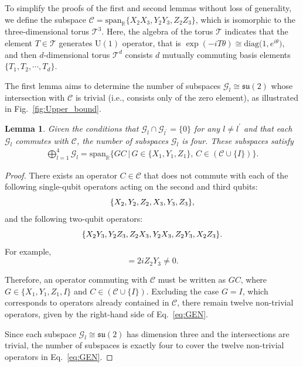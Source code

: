 \documentclass[aps,showpacs,amsmath,amssymb,twocolumn,prx,longbibliography,superscriptaddress,notitlepage,floatfix,10pt]{revtex4-2}
\newtheorem{lemma}{Lemma} %
\begin{document}
To simplify the proofs of the first and second lemmas without loss of generality, we define the subspace $\mathcal{C} = \mathrm{span}_{\mathbb{R}}\{X_{2}X_{3}, Y_{2}Y_{3}, Z_{2}Z_{3}\}$, which is isomorphic to the three-dimensional torus $\mathcal{T}^{3}$. Here, the algebra of the torus $\mathcal{T}$ indicates that the element $T\in\mathcal{T}$ generates $\mathrm{U}(1)$ operator, that is $\exp(-iT\theta)\cong\mathrm{diag}\bigl(1,e^{i\theta}\bigr)$, and then $d$-dimensional torus $\mathcal{T}^d$ consists $d$ mutually commuting basis elements $\{T_{1},T_{2},\cdots,T_d\}$.

The first lemma aims to determine the number of subspaces $\mathcal{G}_{l} \cong \mathfrak{su}(2)$ whose intersection with $\mathcal{C}$ is trivial (i.e., consists only of the zero element), as illustrated in Fig.~\ref{fig:Upper_bound}.

\begin{lemma}
  Given the conditions that
  $\mathcal{G}_{l}\cap \mathcal{G}_{l^{\prime}}=\{0\}$
  for any $l\neq l^{\prime}$ and that each
  $\mathcal{G}_{l}$ commutes with $\mathcal{C}$,
  the number of subspaces $\mathcal{G}_{l}$ is four.
  These subspaces satisfy
  \begin{equation}
      \begin{split}
      \bigoplus_{l=1}^{4}
    \mathcal{G}_{l}
    =
    \mathrm{span}_{\mathbb{R}}
    \bigl\{
        GC
        \,\big|\,
        G\in\{X_{1},Y_{1},Z_{1}\},
        \,
        C\in\left(\mathcal{C}\cup\{I\}\right)
    \bigr\}.
      \end{split}
            \label{eq:GEN}
  \end{equation}
\label{lemma:1}
\end{lemma}

\begin{proof}
There exists an operator $C\in\mathcal{C}$ that does not commute with each of the following single-qubit operators acting on the second and third qubits:
\begin{equation}
    \{ X_{2}, Y_{2}, Z_{2}, X_{3}, Y_{3}, Z_{3} \},
\label{eq:one_ope_{2}3}
\end{equation}
and the following two-qubit operators:
\begin{equation}
    \{ X_{2} Y_{3}, Y_{2} Z_{3}, Z_{2} X_{3},
    Y_{2} X_{3}, Z_{2} Y_{3}, X_{2} Z_{3} \}.
\label{eq:two_ope_{2}3}
\end{equation}
For example,
\begin{equation}
    [ X_{2}, Y_{2} Y_{3} ]
    =
    2 i Z_{2} Y_{3}
    \neq 0.
\end{equation}

Therefore, an operator commuting with $\mathcal{C}$ must be written as $GC$, where
$G\in\{X_{1},Y_{1},Z_{1},I\}$ and
$C\in(\mathcal{C}\cup \{I\})$.
Excluding the case $G=I$, which corresponds to operators already contained in $\mathcal{C}$, there remain twelve non-trivial operators, given by the right-hand side of Eq.~\eqref{eq:GEN}.

Since each subspace $\mathcal{G}_{l}\cong\mathfrak{su}(2)$ has dimension three and the intersections are trivial, the number of subspaces is exactly four to cover the twelve non-trivial operators in Eq.~\eqref{eq:GEN}.
\end{proof}
\end{document}
